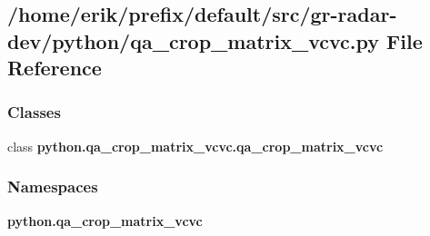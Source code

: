 \subsection{/home/erik/prefix/default/src/gr-\/radar-\/dev/python/qa\+\_\+crop\+\_\+matrix\+\_\+vcvc.py File Reference}
\label{qa__crop__matrix__vcvc_8py}
\subsubsection*{Classes}
\begin{DoxyCompactItemize}
\item 
class {\bf python.\+qa\+\_\+crop\+\_\+matrix\+\_\+vcvc.\+qa\+\_\+crop\+\_\+matrix\+\_\+vcvc}
\end{DoxyCompactItemize}
\subsubsection*{Namespaces}
\begin{DoxyCompactItemize}
\item 
 {\bf python.\+qa\+\_\+crop\+\_\+matrix\+\_\+vcvc}
\end{DoxyCompactItemize}
